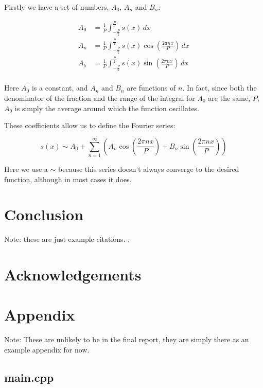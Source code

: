 \documentclass[12pt,english]{article}
\begin{document}
Firstly we have a set of numbers, \(A_0\), \(A_n\) and \(B_n\):

\begin{equation}
\begin{aligned}
	A_0 &= \frac{1}{P} \int_{-\frac{P}{2}}^{\frac{P}{2}}
		s(x) \,dx \\
	A_n &= \frac{1}{P} \int_{-\frac{P}{2}}^{\frac{P}{2}}
		s(x) \cos \left(\frac{2\pi nx}{P}\right) \,dx \\
	A_b &= \frac{1}{P} \int_{-\frac{P}{2}}^{\frac{P}{2}}
		s(x) \sin \left(\frac{2\pi nx}{P}\right) \,dx \\
\end{aligned}
\end{equation}

Here \(A_0\) is a constant, and \(A_n\) and \(B_n\) are functions of \(n\).
In fact, since both the denominator of the fraction and the range of the integral for \(A_0\) are the same, \(P\),
\(A_0\) is simply the average around which the function oscillates.

These coefficients allow us to define the Fourier series:

\begin{equation}
	s(x) \sim A_0 + \sum_{n=1}^{\infty} \left(
		A_n \cos \left( \frac{2\pi nx}{P} \right) +
		B_n \sin \left( \frac{2\pi nx}{P} \right)
	\right)
\end{equation}

Here we use a \(\sim\) because this series doesn't always converge to the desired function, although in most cases it
does.

\section{Conclusion}
Note: these are just example citations.
\cite[p. 150]{nixon:2019}
\cite{thompson:1961}
\cite{lestrel:1997}
\cite{cartwright:1990}
\cite{dryden:2016}
.

\section{Acknowledgements}

\section{Appendix}
Note: These are unlikely to be in the final report, they are simply there as an example appendix for now.
\subsection*{main.cpp}
\inputminted[breakanywhere=true]{cpp}{../code/elliptic_fourier/main.cpp}
\end{document}
